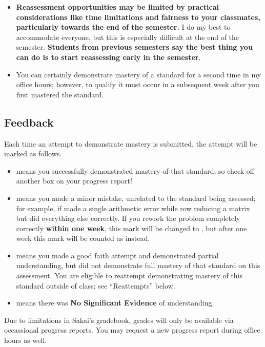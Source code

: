 {\begin{enumerate}[1)]
\begin{itemize}
    \item \textbf{Reassessment opportunities may be limited by practical considerations like time limitations and fairness to your classmates, particularly towards the end of the semester.}  I do my best to accommodate everyone, but this is especially difficult at the end of the semester.  {\bf Students from previous semesters say the best thing you can do is to start reassessing early in the semester}.
    \item You can certainly demonstrate mastery of a standard for a second time in my office hours; however, to qualify it must occur in a subsequent week after you first mastered the standard.
    \end{itemize}
    \end{enumerate}
}{
    \subsection*{\fontsize{10}{12}\selectfont Feedback}
    Each time an attempt to demonstrate mastery is submitted, the attempt will be marked as follows.
    \begin{itemize}
    \item \masteryMark{} means you successfully demonstrated mastery of that standard, so check off another box on your progress report!
    \item \minorMark{} means you made a minor mistake, unrelated to the standard being assessed; for example, if made a single arithmetic error while row reducing a matrix but did everything else correctly. If you rework the problem completely correctly \textbf{within one week}, this mark will be changed to \masteryMark{}, but after one week this mark will be counted as \reattemptMark{} instead.
    \item \reattemptMark{} means you made a good faith attempt and demonstrated partial understanding, but did not demonstrate full mastery of that standard on this assessment. You are eligible to reattempt demonstrating mastery of this standard outside of class; see ``Reattempts'' below.
    \item \noMark{} means there was {\bf No Significant Evidence} of understanding.
    \end{itemize}
    Due to limitations in Sakai's gradebook, grades will only be available via occassional progress reports. You may request a new progress report during office hours as well.


}
